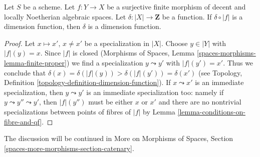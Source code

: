 \begin{lemma}
\label{lemma-check-dimension-function-finite-cover}
Let $S$ be a scheme. Let $f : Y \to X$ be a surjective finite morphism of
decent and locally Noetherian algebraic spaces. Let
$\delta : |X| \to \mathbf{Z}$ be a function. If $\delta \circ |f|$ is a
dimension function, then $\delta$ is a dimension function.
\end{lemma}

\begin{proof}
Let $x \mapsto x'$, $x \not = x'$ be a specialization in $|X|$.
Choose $y \in |Y|$ with $|f|(y) = x$. Since $|f|$ is closed
(Morphisms of Spaces, Lemma \ref{spaces-morphisms-lemma-finite-proper})
we find a specialization $y \leadsto y'$ with $|f|(y') = x'$.
Thus we conclude that
$\delta(x) = \delta(|f|(y)) > \delta(|f|(y')) = \delta(x')$
(see Topology, Definition \ref{topology-definition-dimension-function}).
If $x \leadsto x'$ is an immediate specialization, then
$y \leadsto y'$ is an immediate specialization too:
namely if $y \leadsto y'' \leadsto y'$, then $|f|(y'')$
must be either $x$ or $x'$ and there are no nontrivial
specializations between points of fibres of $|f|$ by
Lemma \ref{lemma-conditions-on-fibre-and-qf}.
\end{proof}

\noindent
The discussion will be continued in
More on Morphisms of Spaces, Section
\ref{spaces-more-morphisms-section-catenary}.

















